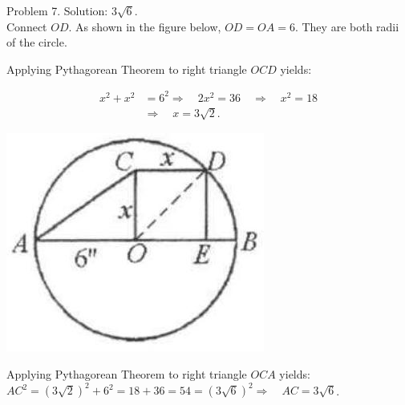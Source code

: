 \documentclass[10pt]{article}
\begin{document}
Problem 7. Solution: \(3 \sqrt{6}\).\\
Connect \(O D\). As shown in the figure below, \(O D=O A=6\). They are both radii of the circle.

Applying Pythagorean Theorem to right triangle \(O C D\) yields:

\[
\begin{aligned}
x^{2}+x^{2} & =6^{2} \Rightarrow \quad 2 x^{2}=36 \quad \Rightarrow \quad x^{2}=18 \\
& \Rightarrow \quad x=3 \sqrt{2} .
\end{aligned}
\]

\begin{center}
\includegraphics[max width=\textwidth]{2025_04_17_97bc1f7e44d93c271a88g-159}
\end{center}

Applying Pythagorean Theorem to right triangle \(O C A\) yields:\\
\(A C^{2}=(3 \sqrt{2})^{2}+6^{2}=18+36=54=(3 \sqrt{6})^{2} \Rightarrow \quad A C=3 \sqrt{6}\).
\end{document}
